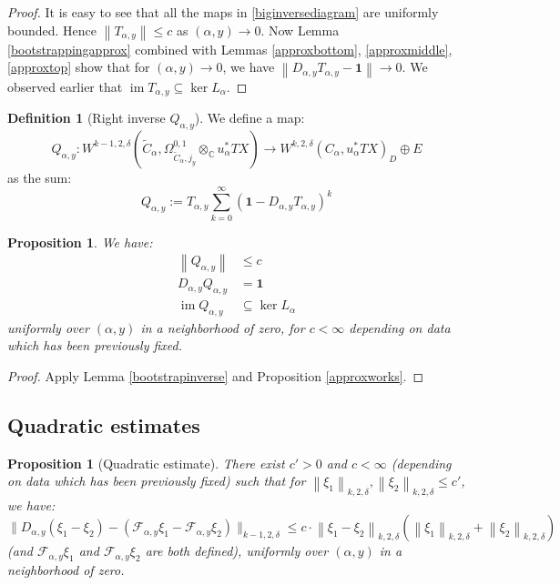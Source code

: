 \documentclass[12pt]{article}
\newtheorem{proposition}[theorem]{Proposition}
\theoremstyle{definition}
\newtheorem{definition}[theorem]{Definition}
\theoremstyle{remark}
\numberwithin{equation}{subsection}
\newcommand{\F}{\mathcal F}
\newcommand{\CC}{\mathbb C}
\newcommand{\im}{\operatorname{im}}
\begin{document}
\begin{proof}
It is easy to see that all the maps in \eqref{biginversediagram} are uniformly bounded.  Hence $\left\|T_{\alpha,y}\right\|\leq c$ as $(\alpha,y)\to 0$.  Now Lemma \ref{bootstrappingapprox} combined with Lemmas \ref{approxbottom}, \ref{approxmiddle}, \ref{approxtop} show that for $(\alpha,y)\to 0$, we have $\left\|D_{\alpha,y} T_{\alpha,y}-\mathbf 1\right\|\to 0$.  We observed earlier that $\im T_{\alpha,y}\subseteq\ker L_\alpha$.
\end{proof}

\begin{definition}[Right inverse $Q_{\alpha,y}$]
We define a map:
\begin{equation}
Q_{\alpha,y}:W^{k-1,2,\delta}(\tilde C_\alpha,\Omega^{0,1}_{\tilde C_\alpha,j_y}\otimes_\CC u_\alpha^\ast TX)\to W^{k,2,\delta}(C_\alpha,u_\alpha^\ast TX)_D\oplus E
\end{equation}
as the sum:
\begin{equation}
Q_{\alpha,y}:=T_{\alpha,y}\sum_{k=0}^\infty(\mathbf 1-D_{\alpha,y} T_{\alpha,y})^k
\end{equation}
\end{definition}

\begin{proposition}\label{Qestimates}
We have:
\begin{align}
\left\|Q_{\alpha,y}\right\|&\leq c\\
D_{\alpha,y}Q_{\alpha,y}&=\mathbf 1\\
\im Q_{\alpha,y}&\subseteq\ker L_\alpha
\end{align}
uniformly over $(\alpha,y)$ in a neighborhood of zero, for $c<\infty$ depending on data which has been previously fixed.
\end{proposition}

\begin{proof}
Apply Lemma \ref{bootstrapinverse} and Proposition \ref{approxworks}.
\end{proof}

\subsection{Quadratic estimates}

\begin{proposition}[Quadratic estimate]\label{quadestimate}
There exist $c'>0$ and $c<\infty$ (depending on data which has been previously fixed) such that for $\left\|\xi_1\right\|_{k,2,\delta},\left\|\xi_2\right\|_{k,2,\delta}\leq c'$, we have:
\begin{equation}\label{quadestgoal}
\bigl\|D_{\alpha,y}(\xi_1-\xi_2)-(\F_{\alpha,y}\xi_1-\F_{\alpha,y}\xi_2)\bigr\|_{k-1,2,\delta}\leq c\cdot\left\|\xi_1-\xi_2\right\|_{k,2,\delta}(\left\|\xi_1\right\|_{k,2,\delta}+\left\|\xi_2\right\|_{k,2,\delta})
\end{equation}
(and $\F_{\alpha,y}\xi_1$ and $\F_{\alpha,y}\xi_2$ are both defined), uniformly over $(\alpha,y)$ in a neighborhood of zero.
\end{proposition}
\end{document}
